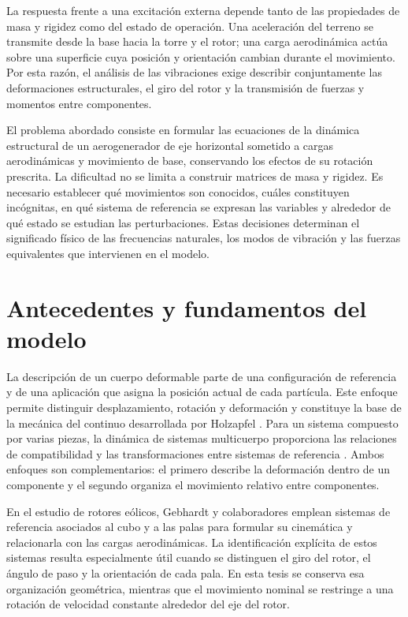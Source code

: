 \documentclass[11pt,a4paper,oneside]{report}
\begin{document}
La respuesta frente a una excitación externa depende tanto de las propiedades de masa y rigidez como del estado de operación. Una aceleración del terreno se transmite desde la base hacia la torre y el rotor; una carga aerodinámica actúa sobre una superficie cuya posición y orientación cambian durante el movimiento. Por esta razón, el análisis de las vibraciones exige describir conjuntamente las deformaciones estructurales, el giro del rotor y la transmisión de fuerzas y momentos entre componentes.

El problema abordado consiste en formular las ecuaciones de la dinámica estructural de un aerogenerador de eje horizontal sometido a cargas aerodinámicas y movimiento de base, conservando los efectos de su rotación prescrita. La dificultad no se limita a construir matrices de masa y rigidez. Es necesario establecer qué movimientos son conocidos, cuáles constituyen incógnitas, en qué sistema de referencia se expresan las variables y alrededor de qué estado se estudian las perturbaciones. Estas decisiones determinan el significado físico de las frecuencias naturales, los modos de vibración y las fuerzas equivalentes que intervienen en el modelo.

\section{Antecedentes y fundamentos del modelo}
La descripción de un cuerpo deformable parte de una configuración de referencia y de una aplicación que asigna la posición actual de cada partícula. Este enfoque permite distinguir desplazamiento, rotación y deformación y constituye la base de la mecánica del continuo desarrollada por Holzapfel \cite{holzapfel}. Para un sistema compuesto por varias piezas, la dinámica de sistemas multicuerpo proporciona las relaciones de compatibilidad y las transformaciones entre sistemas de referencia \cite{shabana}. Ambos enfoques son complementarios: el primero describe la deformación dentro de un componente y el segundo organiza el movimiento relativo entre componentes.

En el estudio de rotores eólicos, Gebhardt y colaboradores \cite{gebhardt2008} emplean sistemas de referencia asociados al cubo y a las palas para formular su cinemática y relacionarla con las cargas aerodinámicas. La identificación explícita de estos sistemas resulta especialmente útil cuando se distinguen el giro del rotor, el ángulo de paso y la orientación de cada pala. En esta tesis se conserva esa organización geométrica, mientras que el movimiento nominal se restringe a una rotación de velocidad constante alrededor del eje del rotor.
\end{document}
